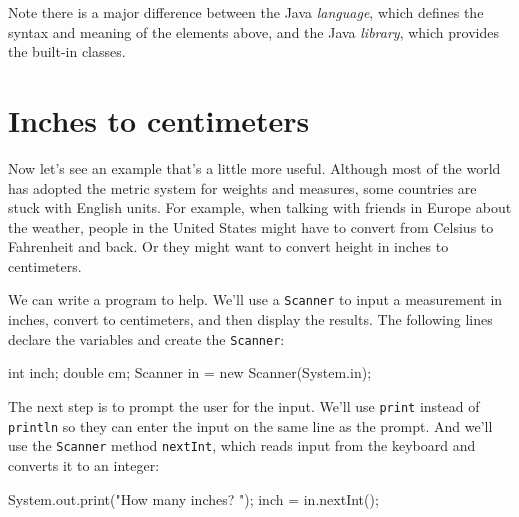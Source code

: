 \documentclass[12pt]{book}
\theoremstyle{exercise}
\newcommand{\java}[1]{\verb"#1"}
\begin{document}

Note there is a major difference between the Java {\em language}, which defines the syntax and meaning of the elements above, and the Java {\em library}, which provides the built-in classes.


\section{Inches to centimeters}

Now let's see an example that's a little more useful.
Although most of the world has adopted the metric system for weights and measures, some countries are stuck with English units.
For example, when talking with friends in Europe about the weather, people in the United States might have to convert from Celsius to Fahrenheit and back.
Or they might want to convert height in inches to centimeters.


We can write a program to help.
We'll use a \java{Scanner} to input a measurement in inches, convert to centimeters, and then display the results.
The following lines declare the variables and create the \java{Scanner}:

\begin{code}
    int inch;
    double cm;
    Scanner in = new Scanner(System.in);
\end{code}

The next step is to prompt the user for the input.
We'll use \java{print} instead of \java{println} so they can enter the input on the same line as the prompt.
And we'll use the \java{Scanner} method \java{nextInt}, which reads input from the keyboard and converts it to an integer:

\begin{code}
    System.out.print("How many inches? ");
    inch = in.nextInt();
\end{code}
\end{document}
